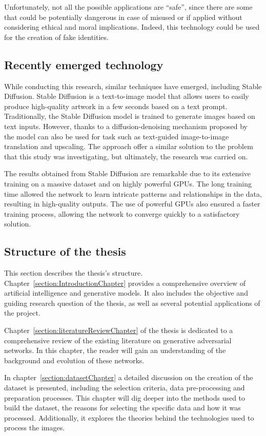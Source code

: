 \noindent Unfortunately, not all the possible applications are “safe”, since there are some that could be potentially dangerous in case of misused or if applied without considering ethical and moral implications. Indeed, this technology could be used for the creation of fake identities.

\subsection{Recently emerged technology}
While conducting this research, similar techniques have emerged, including Stable Diffusion. Stable Diffusion is a text-to-image model that allows users to easily produce high-quality artwork in a few seconds based on a text prompt. Traditionally, the Stable Diffusion model is trained to generate images based on text inputs. However, thanks to a diffusion-denoising mechanism proposed by~\cite{SDEedit} the model can also be used for task such as text-guided image-to-image translation and upscaling.
%
The approach offer a similar solution to the problem that this study was investigating, but ultimately, the research was carried on.

\noindent The results obtained from Stable Diffusion are remarkable due to its extensive training on a massive dataset and on highly powerful GPUs. The long training time allowed the network to learn intricate patterns and relationships in the data, resulting in high-quality outputs. The use of powerful GPUs also ensured a faster training process, allowing the network to converge quickly to a satisfactory solution.

\subsection{Structure of the thesis}
This section describes the thesis's structure. Chapter~\ref{section:IntroductionChapter} provides a comprehensive overview of artificial intelligence and generative models. It also includes the objective and guiding research question of the thesis, as well as several potential applications of the project.

\noindent Chapter~\ref{section:literatureReviewChapter} of the thesis is dedicated to a comprehensive review of the existing literature on generative adversarial networks. In this chapter, the reader will gain an understanding of the background and evolution of these networks.

\noindent In chapter~\ref{section:datasetChapter} a detailed discussion on the creation of the dataset is presented, including the selection criteria, data pre-processing and preparation processes. This chapter will dig deeper into the methods used to build the dataset, the reasons for selecting the specific data and how it was processed. Additionally, it explores the theories behind the technologies used to process the images.

